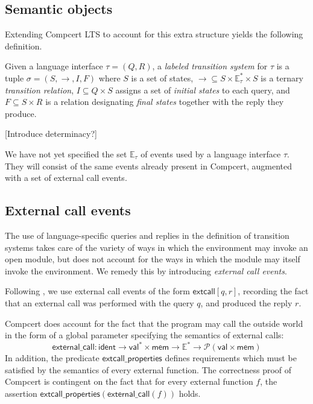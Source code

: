 \documentclass[sigplan,10pt,review,anonymous]{acmart}
\newcommand{\kw}[1]{\ensuremath{ \textsf{#1} }}
\begin{document}

\subsection{Semantic objects} %

Extending Compcert LTS to account for
this extra structure yields the following definition.

\begin{definition}
Given a language interface $\tau = (Q, R)$,
a \emph{labeled transition system} for $\tau$
is a tuple $\sigma = (S, \rightarrow, I, F)$ where
$S$ is a set of states,
${\rightarrow} \subseteq S \times \mathbb{E}_\tau^* \times S$
is a ternary \emph{transition relation},
$I \subseteq Q \times S$
assigns a set of \emph{initial states} to each query, and
$F \subseteq S \times R$
is a relation designating \emph{final states}
together with the reply they produce.
\end{definition}

[Introduce determinacy?]

We have not yet specified the set $\mathbb{E}_\tau$ of events
used by a language interface $\tau$.
They will consist of the same events already present in Compcert,
augmented with a set of external call events.


\subsection{External call events} %

The use of language-specific queries and replies
in the definition of transition systems
takes care of the variety of ways
in which the environment may invoke an open module,
but does not account for the ways in which
the module may itself invoke the environment.
We remedy this by introducing \emph{external call events}.

Following \cite{cpp15},
we use external call events of the form $\kw{extcall}[q, r]$,
recording the fact that an external call was performed
with the query $q$,
and produced the reply $r$.

Compcert does account for the fact that the program
may call the outside world in the form of a global parameter
specifying the semantics of external calls:
\[
  \kw{external\_call} :
    \kw{ident} \rightarrow
    \kw{val}^* \times \kw{mem} \rightarrow
    \mathbb{E}^* \rightarrow
    \mathcal{P}(\kw{val} \times \kw{mem})
\]
In addition,
the predicate $\kw{extcall\_properties}$ defines
requirements which must be satisfied by the semantics
of every external function.
The correctness proof of Compcert is contingent
on the fact that for every external function $f$,
the assertion $\kw{extcall\_properties}(\kw{external\_call}(f))$ holds.
\end{document}
